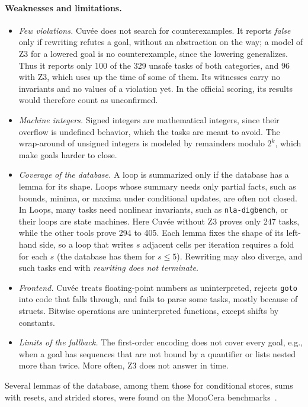 \documentclass[runningheads]{llncs}
\newcommand{\cuvee}{Cuvée}
\newcommand{\code}[1]{\texttt{#1}}
\begin{document}
\paragraph{Weaknesses and limitations.}
\begin{itemize}
\item \emph{Few violations.} \cuvee{} does not search for counterexamples. It reports \emph{false} only
  if rewriting refutes a goal, without an abstraction on the way; a model of Z3 for a lowered goal is no
  counterexample, since the lowering generalizes. Thus it reports only 100 of the 329 unsafe tasks of both
  categories, and 96 with Z3, which uses up the time of some of them. Its witnesses carry no invariants
  and no values of a violation yet. In the official scoring, its results would therefore count as
  unconfirmed.
\item \emph{Machine integers.} Signed integers are mathematical integers, since their overflow is
  undefined behavior, which the tasks are meant to avoid. The wrap-around of unsigned integers is
  modeled by remainders modulo $2^k$, which make goals harder to close.
\item \emph{Coverage of the database.} A loop is summarized only if the database has a lemma for its shape.
  Loops whose summary needs only partial facts, such as bounds, minima, or maxima under conditional
  updates, are often not closed. In Loops, many tasks need nonlinear invariants, such as
  \code{nla-digbench}, or their loops are state machines. Here \cuvee{} without Z3 proves only 247 tasks,
  while the other tools prove 294 to 405. Each lemma fixes the shape of its left-hand side, so a loop that
  writes $s$ adjacent cells per iteration requires a fold for each $s$ (the database has them for
  $s \le 5$). Rewriting may also
  diverge, and such tasks end with \emph{rewriting does not terminate}.
\item \emph{Frontend.} \cuvee{} treats floating-point numbers as uninterpreted, rejects \code{goto} into
  code that falls through, and fails to parse some tasks, mostly because of structs. Bitwise operations are uninterpreted functions, except shifts by constants.
\item \emph{Limits of the fallback.} The first-order encoding does not cover every goal, e.g., when a goal
  has sequences that are not bound by a quantifier or lists nested more than twice. More often, Z3 does
  not answer in time.
\end{itemize}

Several lemmas of the database, among them those for conditional stores, sums with resets, and strided
stores, were found on the MonoCera benchmarks~\cite{monocera,monocera-artifact}.
\end{document}
